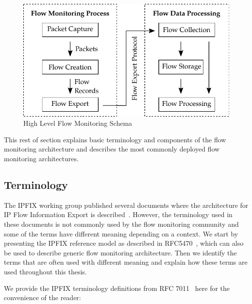 \begin{figure}[t!]
  \begin{center}
    \includegraphics{figures/flow-monitoring-process}
  \end{center}
  \caption{High Level Flow Monitoring Schema}
  \label{fig:flow-monitoring-process}
\end{figure}

This rest of section explains basic terminology and components of the flow monitoring architecture and describes the most commonly deployed flow monitoring architectures.

\subsection{Terminology}

The IPFIX working group published several documents where the architecture for IP Flow Information Export is described~\cite{rfc5470, rfc6183}. However, the terminology used in these documents is not commonly used by the flow monitoring community and some of the terms have different meaning depending on a context. We start by presenting the IPFIX reference model as described in RFC5470~\cite{rfc5470}, which can also be used to describe generic flow monitoring architecture. Then we identify the terms that are often used with different meaning and explain how these terms are used throughout this thesis.

We provide the IPFIX terminology definitions from RFC 7011~\cite{rfc7011} here for the convenience of the reader:


